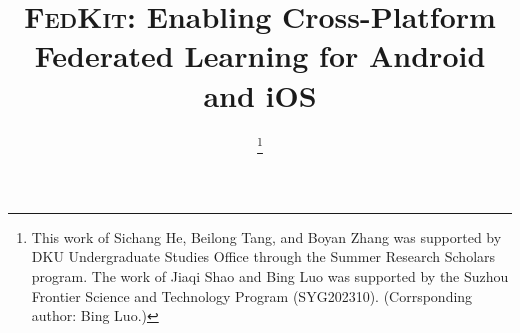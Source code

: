 \documentclass[conference]{IEEEtran}
\begin{document}

\newcommand*\circled[1]{\tikz[baseline=(char.base)]{
        \node[shape=circle,draw,inner sep=.6pt] (char) {#1};}}
\newcommand{\FedCampus}{\textsc{FedCampus}}
\newcommand{\FedKit}{\textsc{FedKit}}
\newcommand{\challa}{\textbf{(C0)}}
\newcommand{\challb}{\textbf{(C1)}}
\newcommand{\challc}{\textbf{(C2)}}


\setlength{}
\setlength{}
\setlength{}
\renewcommand\topfraction{0.95}
\renewcommand\bottomfraction{0.95}
\renewcommand\textfraction{0.05}
\renewcommand\floatpagefraction{0.95}
\setlength{\abovecaptionskip}{3pt plus 0pt minus 2pt}
\setlength{\skip\footins}{0.3cm}

\abovedisplayshortskip=3pt
\belowdisplayshortskip=3pt
\abovedisplayskip=5pt
\belowdisplayskip=5pt






\title
{\FedKit{}: Enabling Cross-Platform Federated Learning for Android and iOS}



\author{
\thanks{This work of Sichang He, Beilong Tang, and Boyan Zhang was supported by DKU Undergraduate Studies Office through the Summer Research Scholars program. The work of Jiaqi Shao and Bing Luo was supported by the Suzhou Frontier Science and Technology Program (SYG202310). (Corrsponding author: Bing Luo.)}}
\end{document}
